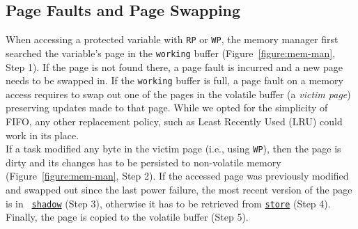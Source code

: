 \subsection{Page Faults and Page Swapping}
%
When accessing a protected variable with \texttt{RP} or \texttt{WP}, the memory
manager first searched the variable's page in the \texttt{working} buffer
(Figure~\ref{figure:mem-man}, Step 1).
If the page is not found there, a page fault is incurred and a new page needs to
be swapped in.
If the \texttt{working} buffer is full, a page fault on a memory access
requires \sys to swap out one of the pages in the volatile buffer (a
\emph{victim page}) preserving updates made to that page.
%
While we opted for the simplicity of FIFO, any other replacement policy, such
as Least Recently Used (LRU) could work in its place. \\
%
If a task modified any byte in the victim page (i.e., using \texttt{WP}), then
the page is dirty and its changes has to be persisted to non-volatile memory
(Figure~\ref{figure:mem-man}, Step 2).
If the accessed page was previously modified and swapped out since the last
power failure, the most recent version of the page is in {\tt
\underline{shadow}} (Step 3), otherwise it has to be retrieved from
{\tt \underline{store}} (Step 4).
Finally, the page is copied to the volatile buffer (Step 5). \\
%
